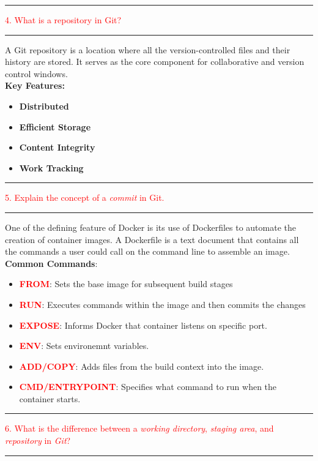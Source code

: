 \documentclass{article}
\begin{document}
\noindent
{\color{red} \rule{\linewidth}{0.5mm}}
\textcolor{red}{4. What is a repository in Git?} \\
\noindent
{\color{red} \rule{\linewidth}{0.5mm}}
A Git repository is a location where all the version-controlled files and their history are stored. It serves as the core component for collaborative and version control windows. \\
\textbf{Key Features:}
\begin{itemize}
    \item \textbf{Distributed }
    \item \textbf{Efficient Storage}
    \item \textbf{Content Integrity}
    \item \textbf{Work Tracking}
\end{itemize}
\noindent
{\color{red} \rule{\linewidth}{0.5mm}}
\textcolor{red}{5. Explain the concept of a \textit{commit} in Git.} \\
\noindent
{\color{red} \rule{\linewidth}{0.5mm}}
One of the defining feature of Docker is its use of Dockerfiles to automate the creation of container images. A Dockerfile is a text document that contains all the commands a user could call on the command line to assemble an image. \\
\textbf{Common Commands}:
\begin{itemize}
    \item \textbf{\textcolor{Red}{FROM}}: \textcolor{PineGreen}{Sets the base image for subsequent build stages}
    \item \textbf{\textcolor{Red}{RUN}}: \textcolor{PineGreen}{Executes commands within the image and then commits the changes}
    \item \textbf{\textcolor{Red}{EXPOSE}}: \textcolor{PineGreen}{Informs Docker that container listens on specific port.}
    \item \textbf{\textcolor{Red}{ENV}}: \textcolor{PineGreen}{Sets environemnt variables.}
    \item \textbf{\textcolor{Red}{ADD/COPY}}: \textcolor{PineGreen}{Adds files from the build context into the image.}
    \item \textbf{\textcolor{Red}{CMD/ENTRYPOINT}}: \textcolor{PineGreen}{Specifies what command to run when the container starts. }
\end{itemize}
\noindent
{\color{red} \rule{\linewidth}{0.5mm}}
\textcolor{red}{6. What is the difference between a \textit{working directory}, \textit{staging area}, and \textit{repository} in \textit{Git}?} \\
\noindent
{\color{red} \rule{\linewidth}{0.5mm}}
\end{document}
